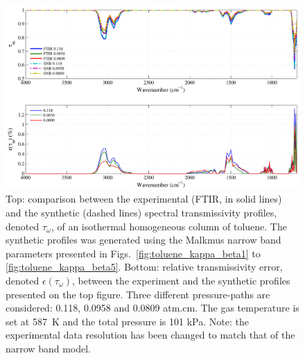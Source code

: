 \begin{figure}[p]
\includegraphics[width=\textwidth]{Figures/Comparison_Fit_Toluene_MALKMUS_Temp587K.pdf}
\caption{Top: comparison between the experimental (FTIR, in solid lines) and the synthetic (dashed lines) spectral transmissivity profiles, denoted $\tau_{\omega}$, of an isothermal homogeneous column of toluene. The synthetic profiles was generated using the Malkmus narrow band parameters presented in Figs.~\ref{fig:toluene_kappa_beta1} to \ref{fig:toluene_kappa_beta5}. Bottom: relative transmissivity error, denoted $\epsilon{(\tau_{\omega})}$, between the experiment and the synthetic profiles presented on the top figure. Three different pressure-paths are considered: 0.118, 0.0958 and 0.0809 atm.cm. The gas temperature is set at 587~K and the total pressure is 101 kPa. Note: the experimental data resolution has been changed to match that of the narrow band model. \label{fig:toluene_SNBVerify_587K}}
\end{figure}

